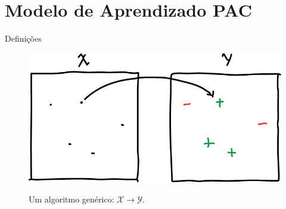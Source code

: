 \documentclass[10pt, professionalfonts]{beamer}
\begin{document}
{
\AtBeginSection{}
\section{Modelo de Aprendizado PAC}

\begin{frame}{Definições}
  \begin{figure}[!htp]
    \centering
    \includegraphics[width=.8\textwidth]{function}
    \label{function}
    \caption{Um algoritmo genérico: $\mathcal{X} \to \mathcal{Y}$.}
  \end{figure}
\end{frame}

}
\end{document}

